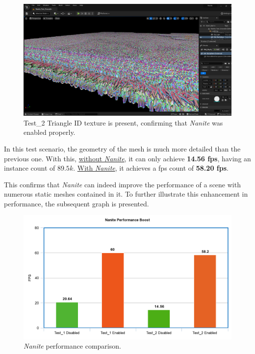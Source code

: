 \documentclass[10pt,journal,compsoc]{IEEEtran}
\begin{document}
\begin{figure}[H]
    \centering
    \includegraphics[scale=0.16]{img/image2.png}
    \caption{Test\_2 Triangle ID texture is present, confirming that \textit{Nanite} was enabled properly.}
    \label{fig:tidstatue}
\end{figure}

\par In this test scenario, the geometry of the mesh is much more detailed than the previous one. With this, \underline{without \textit{Nanite}}, it can only achieve \textbf{14.56 fps}, having an instance count of $89.5k$. \underline{With \textit{Nanite}}, it achieves a fps count of \textbf{58.20 fps}.

\par This confirms that \textit{Nanite} can indeed improve the performance of a scene with numerous static meshes contained in it. To further illustrate this enhancement in performance, the subsequent graph is presented.

\begin{figure}[H]
    \centering
    \includegraphics[scale=0.2]{img/meta-chart.png}
    \caption{\textit{Nanite} performance comparison.}
    \label{fig:stats}
\end{figure}
\end{document}
